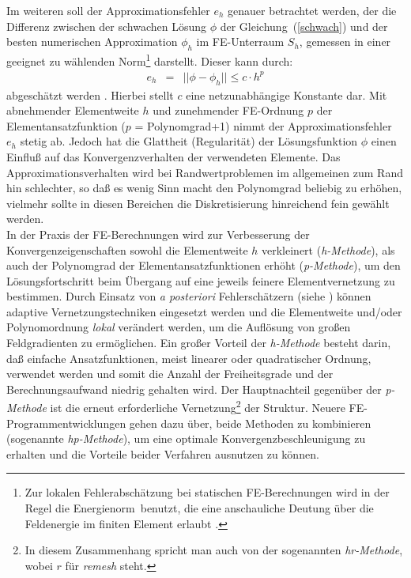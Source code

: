 %
Im weiteren soll der Approximationsfehler $e_{h}$ genauer betrachtet werden,
der die Differenz zwischen der schwachen Lösung $\phi$ der
Gleichung~(\ref{schwach}) und der besten numerischen
Approximation $\phi_{h}$ im FE-Unterraum $S_{h}$, gemessen in einer
geeignet zu wählenden
Norm\footnote{Zur lokalen Fehlerabschätzung bei statischen FE-Berechnungen
wird in der Regel die \glqq Energienorm\grqq \, benutzt, die eine
anschauliche Deutung über die Feldenergie im finiten Element erlaubt
\cite{Bra91, Hac86}.} darstellt. Dieser kann durch:
\begin{eqnarray}
\label{femfehler}
 e_{h} & = & || \phi - \phi_{h} || \leq c \cdot h^{p}
\end{eqnarray}
abgeschätzt werden \cite{Bra91}. Hierbei stellt $c$ eine netzunabhängige
Konstante dar.
Mit abnehmender Elementweite $h$ und zunehmender FE-Ordnung $p$ der
Elementansatzfunktion ($p$ = Polynomgrad+1) nimmt der Approximationsfehler
$e_{h}$ stetig ab. Jedoch hat die Glattheit (Regularität) der Lösungsfunktion
$\phi$ einen Einfluß auf das Konvergenzverhalten der verwendeten Elemente.
Das Approximationsverhalten wird bei Randwertproblemen im allgemeinen
zum Rand hin schlechter, so daß es wenig Sinn macht den Polynomgrad
beliebig zu erhöhen, vielmehr sollte
in diesen Bereichen die Diskretisierung hinreichend fein gewählt werden. \\
%
In der Praxis der FE-Berechnungen wird zur Verbesserung der
Konvergenzeigenschaften sowohl die Elementweite $h$ verkleinert
({\em h-Methode}), als auch der Polynomgrad der Elementansatzfunktionen
erhöht ({\em p-Methode}), um den Lösungsfortschritt beim Übergang auf eine
jeweils feinere Elementvernetzung zu bestimmen.
Durch Einsatz von {\em a posteriori}
Fehlerschätzern (siehe \cite{Zie87}) können adaptive Vernetzungstechniken
eingesetzt werden und die Elementweite und/oder Polynomordnung {\em lokal}
verändert werden, um die Auflösung von großen Feldgradienten zu ermöglichen.
Ein großer Vorteil der {\em h-Methode} besteht darin, daß einfache
Ansatzfunktionen, meist linearer oder quadratischer Ordnung, verwendet
werden und somit die Anzahl der Freiheitsgrade und der Berechnungsaufwand
niedrig gehalten wird. Der Hauptnachteil gegenüber der {\em p-Methode}
ist die erneut erforderliche Vernetzung\footnote{In diesem Zusammenhang
spricht man auch von der sogenannten {\em hr-Methode}, wobei $r$ für
{\em remesh} steht.} der Struktur. Neuere FE-Programmentwicklungen gehen
dazu über, beide Methoden zu kombinieren (sogenannte {\em hp-Methode}), um
eine optimale Konvergenzbeschleunigung zu erhalten und die Vorteile beider
Verfahren ausnutzen zu können.


